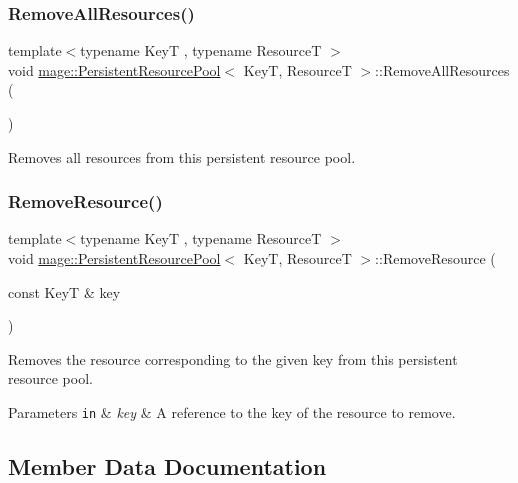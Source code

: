 \subsubsection{\texorpdfstring{Remove\+All\+Resources()}{RemoveAllResources()}}
{\footnotesize\ttfamily template$<$typename KeyT , typename ResourceT $>$ \\
void \hyperlink{classmage_1_1_persistent_resource_pool}{mage\+::\+Persistent\+Resource\+Pool}$<$ KeyT, ResourceT $>$\+::Remove\+All\+Resources (\begin{DoxyParamCaption}{ }\end{DoxyParamCaption})}

Removes all resources from this persistent resource pool. \hypertarget{classmage_1_1_persistent_resource_pool_ab9f233a5510cf9dc35454b7f3b8b415f}{}\label{classmage_1_1_persistent_resource_pool_ab9f233a5510cf9dc35454b7f3b8b415f} 
\subsubsection{\texorpdfstring{Remove\+Resource()}{RemoveResource()}}
{\footnotesize\ttfamily template$<$typename KeyT , typename ResourceT $>$ \\
void \hyperlink{classmage_1_1_persistent_resource_pool}{mage\+::\+Persistent\+Resource\+Pool}$<$ KeyT, ResourceT $>$\+::Remove\+Resource (\begin{DoxyParamCaption}\item[{const KeyT \&}]{key }\end{DoxyParamCaption})}

Removes the resource corresponding to the given key from this persistent resource pool.


\begin{DoxyParams}[1]{Parameters}
\mbox{\tt in}  & {\em key} & A reference to the key of the resource to remove. \\
\hline
\end{DoxyParams}


\subsection{Member Data Documentation}
\hypertarget{classmage_1_1_persistent_resource_pool_a012bb02caf20ff4bcfcfe60331d37310}{}\label{classmage_1_1_persistent_resource_pool_a012bb02caf20ff4bcfcfe60331d37310} 
